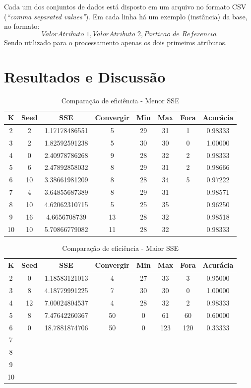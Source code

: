 \documentclass[12pt, a4paper]{article}
\begin{document}
Cada um dos conjuntos de dados está disposto em um arquivo no formato CSV (\emph{``comma separated values''}). Em cada linha há um exemplo (instância) da base, no formato: $$Valor Atributo\_1, Valor Atributo\_2, Particao\_de\_Referencia$$ Sendo utilizado para o processamento apenas os dois primeiros atributos.

\section{Resultados e Discussão}

\begin{table}[!ht]
	\centering
	\caption{Comparação de eficiência - Menor SSE}	
	\label{tabMelhor}
	\begin{tabular}{|c|c|c|c|c|c|c|c|}
	\hline
	K & Seed & SSE & Convergir & Min & Max & Fora & Acurácia\\
	\hline
	2 & 2 & 1.17178486551 & 5 & 29 & 31 & 1 & 0.98333 \\
	\hline
	3 & 2 & 1.82592591238 & 5 & 30 & 30 & 0 & 1.00000 \\
	\hline
	4 & 0 & 2.40978786268 & 9 & 28 & 32 & 2 & 0.98333\\
	\hline
	5 & 6 & 2.47892858032 & 8 & 29 & 31 & 2 & 0.98666\\
	\hline
	6 & 10 & 3.38661981209 & 8 & 28 & 34 & 5 & 0.97222\\
	\hline
	7 & 4 & 3.64855687389 & 8 & 29 & 31 & & 0.98571\\
	\hline
	8 & 10 & 4.62062310715 & 5 & 25 & 35 & & 0.96250\\ %
	\hline
	9 & 16 & 4.6656708739 & 13 & 28 & 32 & & 0.98518\\
	\hline
	10 & 10 & 5.70866779082 & 11 & 28 & 32 & & 0.98333\\
	\hline
	\end{tabular}
\end{table}

\begin{table}[!ht]
	\centering
	\caption{Comparação de eficiência - Maior SSE}	
	\label{tabPior}
	\begin{tabular}{|c|c|c|c|c|c|c|c|}
	\hline
	K & Seed & SSE & Convergir & Min & Max & Fora & Acurácia\\
	\hline
	2 & 0 & 1.18583121013 & 4 & 27 & 33 & 3 & 0.95000 \\
	\hline
	3 & 8 & 4.18779991225 & 7 & 30 & 30 & 0 & 1.00000 \\
	\hline
	4 & 12 & 7.00024804537 & 4 & 28 & 32 & 2 & 0.98333\\
	\hline
	5 & 8 & 7.47642260367 & 50 & 0 & 61 & 60 & 0.60000\\
	\hline
	6 & 0 & 18.7881874706 & 50 & 0 & 123 & 120 & 0.33333\\
	\hline
	7 &  &  &  &  &  & &\\
	\hline
	8 &  &  &  &  &  & &\\
	\hline
	9 &  &  &  &  &  & &\\
	\hline
	10 &  &  &  &  &  & &\\
	\hline
	\end{tabular}
\end{table}
\end{document}
